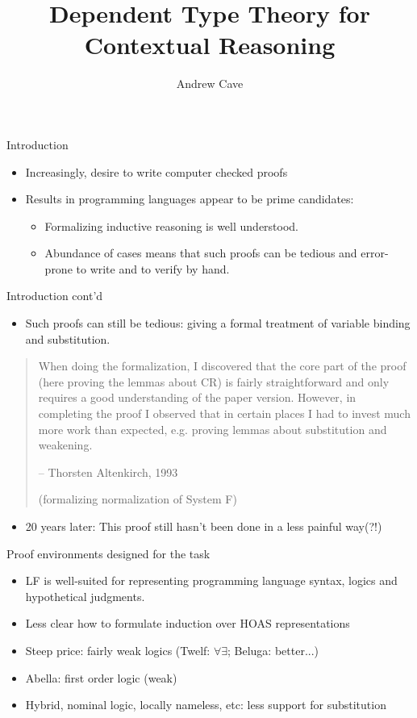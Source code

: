 \documentclass[usenames,dvipsnames]{beamer}
\author{Andrew Cave}
\title[{\makebox[.45\paperwidth]{Dependent Type Theory for Contextual Reasoning\hfill%
       \insertframenumber/\inserttotalframenumber}}]{Dependent Type Theory for Contextual Reasoning}
\begin{document}
\begin{frame}
\titlepage
\end{frame}

\begin{frame}{Introduction}
\begin{itemize}
\item Increasingly, desire to write computer checked proofs
\item Results in programming languages appear to be prime
candidates:
\begin{itemize}
\item Formalizing inductive reasoning is well understood.
\item Abundance of cases means that such proofs can be
tedious and error-prone to write and to verify by hand.
\end{itemize}
\end{itemize}
\end{frame}

\begin{frame}{Introduction cont'd}
\begin{itemize}
\item Such proofs can still be tedious: giving a formal treatment of variable binding and
substitution.
\end{itemize}
\begin{quote}
When doing the formalization, I discovered that the core part of the
proof (here proving the lemmas about CR) is fairly straightforward and
only requires a good understanding of the paper version. However, in
completing the proof I observed that in certain places I had to invest
much more work than expected, e.g. proving lemmas about substitution
and weakening.

-- Thorsten Altenkirch, 1993

   (formalizing normalization of System F)
\end{quote}
\pause
\begin{itemize}
\item 20 years later: This proof still hasn't been done in a less painful way(?!)
\end{itemize}
\end{frame}

\begin{frame}{Proof environments designed for the task}
\begin{itemize}
\item LF is well-suited for representing
programming language syntax, logics and hypothetical
judgments.
\item Less clear how to formulate induction
over HOAS representations
\item Steep price: fairly weak logics (Twelf: $\forall\exists$; Beluga: better...)
\item Abella: first order logic (weak)
\item Hybrid, nominal logic, locally nameless, etc: less support for substitution
\end{itemize}
\end{frame}
\end{document}
